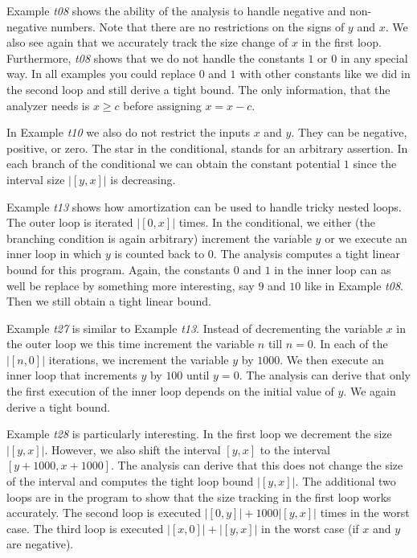 \documentclass[nocopyrightspace,preprint,pldi]{sigplanconf-pldi15}
\begin{document}
{Example \emph{t08} shows the ability of the analysis to handle
negative and non-negative numbers.  Note that there are no
restrictions on the signs of $y$ and $x$.  We also see again that we
accurately track the size change of $x$ in the first loop.
Furthermore, \emph{t08} shows that we do not handle the constants $1$
or $0$ in any special way.  In all examples you could replace $0$ and
$1$ with other constants like we did in the second loop and still
derive a tight bound.  The only information, that the analyzer needs
is $x \geq c$ before assigning $x = x - c$.

In Example \emph{t10} we also do not restrict the inputs $x$ and $y$.
They can be negative, positive, or zero.  The star {\tt *} in the
conditional, stands for an arbitrary assertion.  In each branch of the
conditional we can obtain the constant potential $1$ since the interval
size $|[y,x]|$ is decreasing.

Example \emph{t13} shows how amortization can be used to handle tricky
nested loops.  The outer loop is iterated $|[0,x]|$ times.  In the
conditional, we either (the branching condition is again arbitrary)
increment the variable $y$ or we execute an inner loop in which $y$ is
counted back to $0$.  The analysis computes a tight linear bound for
this program.  Again, the constants $0$ and $1$ in the inner loop can
as well be replace by something more interesting, say $9$ and $10$
like in Example \emph{t08}.  Then we still obtain a tight linear
bound.

Example \emph{t27} is similar to Example \emph{t13}.  Instead of
decrementing the variable $x$ in the outer loop we this time increment
the variable $n$ till $n = 0$.  In each of the $|[n,0]|$ iterations,
we increment the variable $y$ by $1000$.  We then execute an inner
loop that increments $y$ by $100$ until $y=0$.  The analysis can
derive that only the first execution of the inner loop depends on the
initial value of $y$.  We again derive a tight bound.

Example \emph{t28} is particularly interesting.  In the first loop we
decrement the size $|[y,x]|$.  However, we also shift the interval
$[y,x]$ to the interval $[y+1000,x+1000]$.  The analysis can derive
that this does not change the size of the interval and computes the
tight loop bound $|[y,x]|$.  The additional two loops are in the
program to show that the size tracking in the first loop works
accurately.  The second loop is executed $|[0,y]| + 1000|[y,x]|$ times
in the worst case.  The third loop is executed $|[x,0]| + |[y,x]|$ in
the worst case (if $x$ and $y$ are negative).

}
\end{document}
